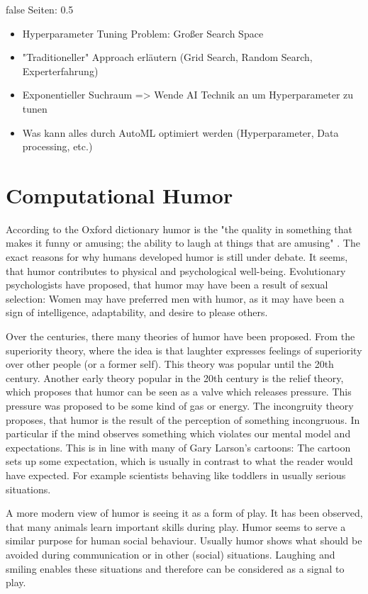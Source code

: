 \documentclass[draft,final,oneside]{vutinfth} %
\begin{document}
\if false
Seiten: 0.5

\begin{itemize}
\item Hyperparameter Tuning Problem: Großer Search Space
\item "Traditioneller" Approach erläutern (Grid Search, Random Search, Experterfahrung)
\item Exponentieller Suchraum => Wende AI Technik an um Hyperparameter zu tunen
\item Was kann alles durch AutoML optimiert werden (Hyperparameter, Data processing, etc.)
\end{itemize}

\fi

\section{Computational Humor} \label{comphumorbackground}

According to the Oxford dictionary humor is the "the quality in something that makes it funny or amusing; the ability to laugh at things that are amusing" \cite{humordef}. The exact reasons for why humans developed humor is still under debate. It seems, that humor contributes to physical and psychological well-being. \cite{humorhealthy} Evolutionary psychologists have proposed, that humor may have been a result of sexual selection: Women may have preferred men with humor, as it may have been a sign of intelligence, adaptability, and desire to please others. \cite{sep-humor}

Over the centuries, there many theories of humor have been proposed. From the superiority theory, where the idea is that laughter expresses feelings of superiority over other people (or a former self). This theory was popular until the 20th century. Another early theory popular in the 20th century is the relief theory, which proposes that humor can be seen as a valve which releases pressure. This pressure was proposed to be some kind of gas or energy. The incongruity theory proposes, that humor is the result of the perception of something incongruous. In particular if the mind observes something which violates our mental model and expectations. This is in line with many of Gary Larson's cartoons: The cartoon sets up some expectation, which is usually in contrast to what the reader would have expected. For example scientists behaving like toddlers in usually serious situations. \cite{sep-humor}

A more modern view of humor is seeing it as a form of play. It has been observed, that many animals learn important skills during play. Humor seems to serve a similar purpose for human social behaviour. Usually humor shows what should be avoided during communication or in other (social) situations. Laughing and smiling enables these situations and therefore can be considered as a signal to play. 
\end{document}
